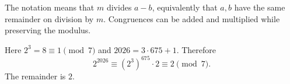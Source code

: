 The notation means that $m$ divides $a-b$, equivalently that $a,b$ have the same remainder on division by $m$. Congruences can be added and multiplied while preserving the modulus.

Here $2^3=8\equiv1\pmod7$ and $2026=3\cdot675+1$. Therefore
\[
2^{2026}\equiv(2^3)^{675}\cdot2\equiv2\pmod7.
\]
The remainder is $\boxed2$.
